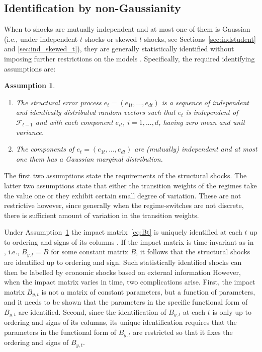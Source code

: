 \documentclass[nojss]{jss}
\newtheorem{assumption}{Assumption}
\begin{document}
\subsection{Identification by non-Gaussianity}\label{sec:ident_non_gauss}

When to shocks are mutually independent and at most one of them is Gaussian (i.e., under independent $t$ shocks or skewed $t$ shocks, see Sections~\ref{sec:indstudent} and \ref{sec:ind_skewed_t}), they are generally statistically identified without imposing further restrictions on the models \citep{Virolainen2:2024}. Specifically, the required identifying assumptions are:
\begin{assumption}\label{as:shocks}
\begin{enumerate}%
\item The structural error process $e_t=(e_{1t},...,e_{dt})$ is a sequence of independent and identically distributed random vectors such that $e_t$ is independent of $\mathcal{F}_{t-1}$ and with each component $e_{it}$, $i=1,...,d$, having zero mean and unit variance.
\item The components of $e_t=(e_{1t},...,e_{dt})$ are (mutually) independent and at most one them has a Gaussian marginal distribution.
\end{enumerate}
\end{assumption}
The first two assumptions state the requirements of the structural shocks. The latter two assumptions state that either the transition weights of the regimes take the value one or they exhibit certain small degree of variation. These are not restrictive however, since generally when the regime-switches are not discrete, there is sufficient amount of variation in the transition weights.

Under Assumption~\ref{as:shocks} the impact matrix~\ref{eq:Bt} is uniquely identified at each $t$ up to ordering and signs of its columns \citep[Lemma~2]{Virolainen2:2024}. If the impact matrix is  time-invariant as in \cite{Lanne+Meitz+Saikkonen:2017}, i.e., $B_{y,t}=B$ for some constant matrix $B$, it follows that the structural shocks are identified up to ordering and sign. Such statistically identified shocks can then be labelled by economic shocks based on external information However, when the impact matrix varies in time, two complications arise. First, the impact matrix $B_{y,t}$ is not a matrix of constant parameters, but a function of parameters, and it needs to be shown that the parameters in the specific functional form of $B_{y,t}$ are identified. Second, since the identification of $B_{y,t}$ at each $t$ is only up to ordering and signs of its columns, its unique identification requires that the parameters in the functional form of $B_{y,t}$ are restricted so that it fixes the ordering and signs of $B_{y,t}$.
\end{document}
